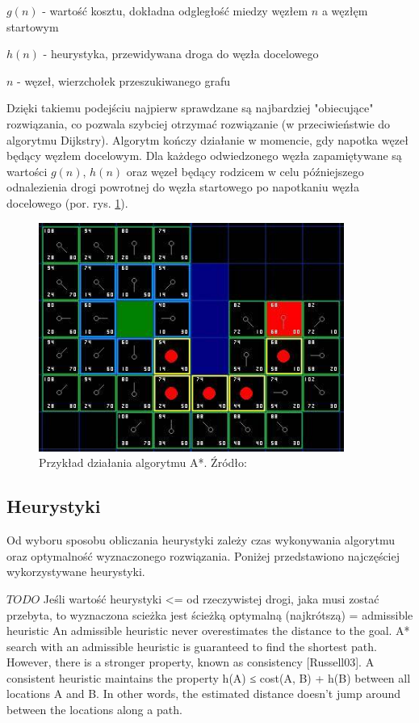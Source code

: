  $g(n)$ - wartość kosztu, dokładna odgległość miedzy węzłem $n$ a węzłęm startowym

 $h(n)$ - heurystyka, przewidywana droga do węzła docelowego

 $n$ - węzeł, wierzchołek przeszukiwanego grafu

Dzięki takiemu podejściu najpierw sprawdzane są najbardziej "obiecujące" rozwiązania, co pozwala szybciej otrzymać rozwiązanie (w przeciwieństwie do algorytmu Dijkstry).
Algorytm kończy działanie w momencie, gdy napotka węzeł będący węzłem docelowym.
Dla każdego odwiedzonego węzła zapamiętywane są wartości $g(n)$, $h(n)$ oraz węzeł będący rodzicem w celu późniejszego odnalezienia drogi powrotnej do węzła startowego po napotkaniu węzła docelowego (por. rys. \ref{fig:image_astar2}).

\begin{figure}[H]
	\centering
	\includegraphics[width=10cm]{img/astar-t7}
	\caption{Przykład działania algorytmu A*. Źródło: \cite{astar2}}
	\label{fig:image_astar2}
\end{figure}

\subsection{Heurystyki}
Od wyboru sposobu obliczania heurystyki zależy czas wykonywania algorytmu oraz optymalność wyznaczonego rozwiązania.
Poniżej przedstawiono najczęściej wykorzystywane heurystyki.

$TODO$ Jeśli wartość heurystyki <= od rzeczywistej drogi, jaka musi zostać przebyta, to wyznaczona scieżka jest ścieżką optymalną (najkrótszą)
= admissible heuristic
An admissible heuristic never overestimates the distance to the goal. A* search with an
admissible heuristic is guaranteed to find the shortest path. However, there is a stronger
property, known as consistency [Russell03]. A consistent heuristic maintains the property
h(A) ≤ cost(A, B) + h(B) between all locations A and B. In other words, the estimated
distance doesn’t jump around between the locations along a path.
\cite{cooppath}

